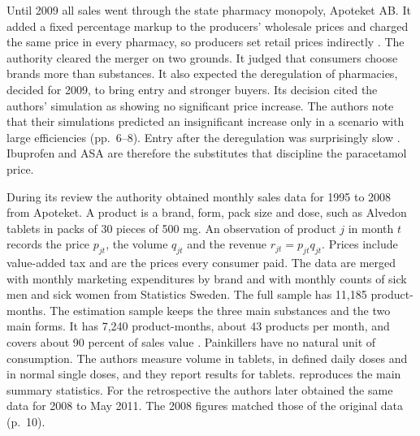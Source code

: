 Until 2009 all sales went through the state pharmacy monopoly, Apoteket AB. It added a fixed percentage markup to
the producers' wholesale prices and charged the same price in every pharmacy, so producers set retail prices
indirectly \citep[pp.~6 and~9]{BjornerstedtVerboven2013}. The authority cleared the merger on two grounds. It
judged that consumers choose brands more than substances. It also expected the deregulation of pharmacies, decided
for 2009, to bring entry and stronger buyers. Its decision cited the authors' simulation as showing no significant
price increase. The authors note that their simulations predicted an insignificant increase only in a scenario with
large efficiencies (pp.~6--8). Entry after the deregulation was surprisingly slow
\citep[p.~134]{BjornerstedtVerboven2016}. Ibuprofen and ASA are therefore the substitutes that discipline the
paracetamol price.

 During its review the authority obtained monthly sales data for 1995 to 2008 from Apoteket. A
product is a brand, form, pack size and dose, such as Alvedon tablets in packs of 30 pieces of 500 mg. An
observation of product $j$ in month $t$ records the price $p_{jt}$, the volume $q_{jt}$ and the revenue
$r_{jt}=p_{jt}q_{jt}$. Prices include value-added tax and are the prices every consumer paid. The data are merged
with monthly marketing expenditures by brand and with monthly counts of sick men and sick women from Statistics
Sweden. The full sample has 11,185 product-months. The estimation sample keeps the three main substances and the
two main forms. It has 7,240 product-months, about 43 products per month, and covers about 90 percent of sales value
\citep[Section 2.3]{BjornerstedtVerboven2013}. Painkillers have no natural unit of consumption. The authors measure
volume in tablets, in defined daily doses and in normal single doses, and they report results for tablets.
 reproduces the main summary statistics. For the retrospective the authors later obtained the
same data for 2008 to May 2011. The 2008 figures matched those of the original data (p.~10).

